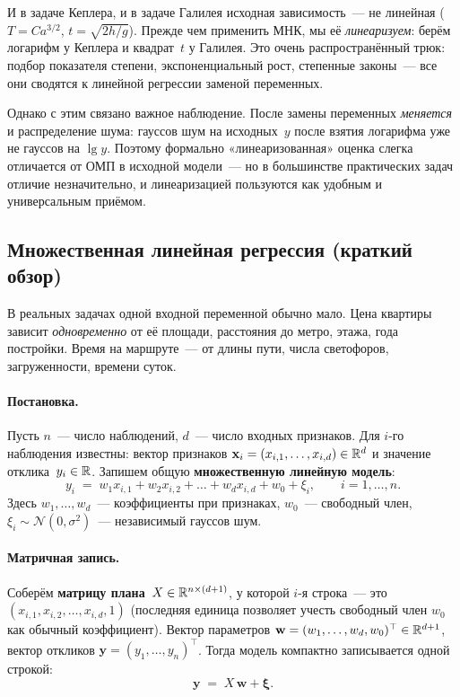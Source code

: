 \begin{notebox}[title={Зачем спрямлять?}]
И в задаче Кеплера, и в задаче Галилея исходная зависимость~--- не линейная
($T=Ca^{3/2}$, $t=\sqrt{2h/g}$). Прежде чем применить МНК, мы её
\emph{линеаризуем}: берём логарифм у Кеплера и квадрат~$t$ у Галилея. Это
очень распространённый трюк: подбор показателя степени, экспоненциальный
рост, степенные законы~--- все они сводятся к линейной регрессии
заменой переменных.

Однако с этим связано важное наблюдение. После замены переменных
\emph{меняется} и распределение шума: гауссов шум на исходных~$y$ после
взятия логарифма уже не гауссов на $\lg y$. Поэтому формально
«линеаризованная» оценка слегка отличается от ОМП в исходной модели~--- но
в большинстве практических задач отличие незначительно, и линеаризацией
пользуются как удобным и универсальным приёмом.
\end{notebox}

\subsection{Множественная линейная регрессия (краткий обзор)}
\label{ssec:multi-reg}

В реальных задачах одной входной переменной обычно мало. Цена квартиры
зависит \emph{одновременно} от её площади, расстояния до метро, этажа,
года постройки. Время на маршруте~--- от длины пути, числа светофоров,
загруженности, времени суток.

\paragraph{Постановка.}
Пусть $n$~--- число наблюдений, $d$~--- число входных признаков. Для
$i$-го наблюдения известны: вектор признаков
$\mathbf x_i=(x_{i,1},\dots,x_{i,d})\in\mathbb{R}^{d}$ и значение
отклика~$y_i\in\mathbb{R}$. Запишем общую \textbf{множественную линейную модель}:
\begin{equation}\label{eq:multireg}
y_i\;=\;w_1 x_{i,1}+w_2 x_{i,2}+\dots+w_d x_{i,d}+w_0+\xi_i,
\qquad i=1,\dots,n.
\end{equation}
Здесь $w_1,\dots,w_d$~--- коэффициенты при признаках, $w_0$~--- свободный
член, $\xi_i\sim\mathcal N(0,\sigma^{2})$~--- независимый гауссов шум.

\paragraph{Матричная запись.}
Соберём \textbf{матрицу плана}~$X\in\mathbb{R}^{n\times(d+1)}$, у которой $i$-я
строка~--- это $(x_{i,1},x_{i,2},\dots,x_{i,d},1)$ (последняя единица
позволяет учесть свободный член $w_0$ как обычный коэффициент). Вектор
параметров $\mathbf w=(w_1,\dots,w_d,w_0)^{\top}\in\mathbb{R}^{d+1}$, вектор
откликов $\mathbf y=(y_1,\dots,y_n)^{\top}$. Тогда модель компактно
записывается одной строкой:
\[
\mathbf y\;=\;X\,\mathbf w+\boldsymbol\xi.
\]

